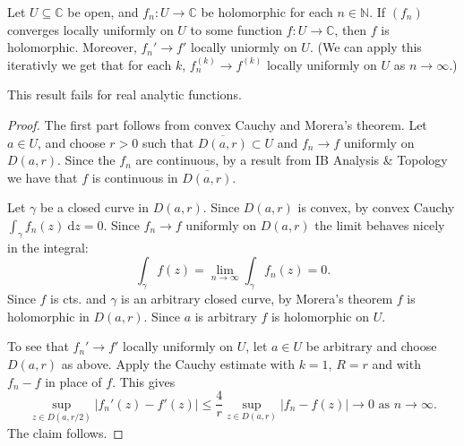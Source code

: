 \documentclass[egregdoesnotlikesansseriftitles,a4paper]{scrartcl}
\begin{document}
\begin{theorem}
      Let $U \subseteq \mathbb{C}$ be open, and $f_{n}: U \rightarrow \mathbb{C}$ be holomorphic for each $n \in \mathbb{N}$. If $(f_{n})$ converges locally uniformly on $U$ to some function $f: U \rightarrow \mathbb{C}$, then $f$ is holomorphic. Moreover, $f_{n}' \rightarrow f'$ locally uniormly on $U$. (We can apply this iterativly we get that for each $k$, $f_{n}^{(k)}\rightarrow f^{(k)}$ locally uniformly on $U$ as $n \rightarrow \infty$.)
      \begin{remark}
            This result fails for real analytic functions.\footnotemark
      \end{remark} 
      \begin{proof}
            The first part follows from convex Cauchy and Morera's theorem. Let $a \in U$, and choose $r>0$ such that $\overline{D (a,r)} \subset U$ and $f_{n}\rightarrow f$ uniformly on $D (a,r)$. Since the $f_{n}$ are continuous, by a result from IB Analysis \& Topology we have that $f$ is continuous in $\overline{D (a,r)}$.

            Let $\gamma$ be a closed curve in $D (a,r)$. Since $D (a,r)$ is convex, by convex Cauchy $\int_{\gamma}^{}f_{n}(z) \ \mathrm{d}z=0 $. Since $f_{n} \rightarrow f$ uniformly on $D (a,r)$ the limit behaves nicely in the integral: \[
               \int_{\gamma}^{}f(z) =\lim_{n \rightarrow \infty}\int_{\gamma}^{}f_{n}(z)=0
            .\] Since $f$ is cts. and $\gamma$ is an arbitrary closed curve, by Morera's theorem $f$ is holomorphic in $D (a,r)$. Since $a$ is arbitrary $f$ is holomorphic on $U$.

            To see that $f_{n}' \rightarrow  f'$ locally uniformly on $U$, let $a \in U$ be arbitrary and choose $D (a,r)$ as above. Apply the Cauchy estimate with $k=1$, $R=r$ and with $f_{n}-f$ in place of $f$. This gives \[
            \sup_{z \in D (a,r/2)}\left|f_{n}' (z)-f' (z)\right| \leq \frac{4}{r} \sup_{z \in D (a,r)} \left|f_{n}-f (z)\right| \rightarrow 0 \text{ as } n \rightarrow \infty
            .\] The claim follows.
      \end{proof}
\end{theorem}
\end{document}
